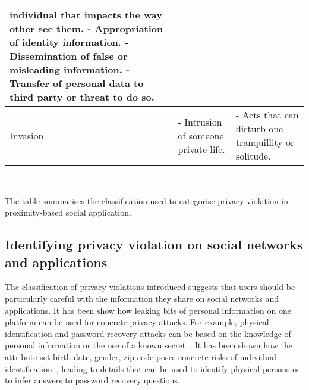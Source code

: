 \begin{table*}[ht]
\begin{tabular}{ | p{6em} || p{6em} || p{14em} |}
        individual that impacts the \newline
        way other see them. \newline
      - Appropriation of identity information. \newline
      - Dissemination of false or misleading \newline
        information. \newline
      - Transfer of personal data to third \newline
        party or threat to do so. \\
  \hline
Invasion		 		
    & - Intrusion of \newline
        someone \newline
        private life.
    & - Acts that can disturb one tranquillity \newline
        or solitude. \\
  \hline 
\end{tabular}
\label{tab:violations}
\\[2.5pt]
 \begin{flushleft}
The table summarises the classification used to categorise privacy violation in proximity-based social application.
\end{flushleft}
\end{table*}

\subsection{Identifying privacy violation on social networks and applications}

The classification of privacy violations introduced suggests that users should be particularly careful with the information they share on social networks and applications. It has been show how leaking bits of personal information on one platform can be used for concrete privacy attacks. For example, physical identification and password recovery attacks can be based on the knowledge of personal information or the use of a known secret~\cite{irani-et-al}. It has been shown how the attribute set {birth-date, gender, zip code} poses concrete risks of individual identification~\cite{sweeney}, leading to details that can be used to identify physical persons or to infer answers to password­ recovery questions.

